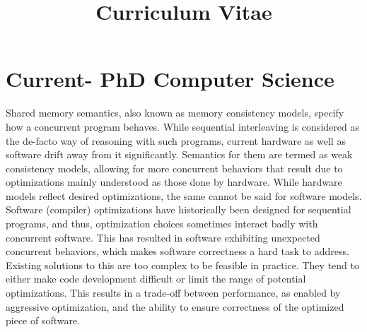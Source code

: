 \documentclass[11pt,a4paper,sans]{moderncv} %
\title{Curriculum Vitae}
\begin{document}

\makecvtitle %


\section{Current- PhD Computer Science}

    Shared memory semantics, also known as memory consistency models, specify how a concurrent program behaves. 
    While sequential interleaving is considered as the de-facto way of reasoning with such programs, current hardware as well as software drift away from it significantly.
    Semantics for them are termed as weak consistency models, allowing for more concurrent behaviors that result due to optimizations mainly understood as those done by hardware.
    While hardware models reflect desired optimizations, the same cannot be said for software models.
    Software (compiler) optimizations have historically been designed for sequential programs, and thus, optimization choices sometimes interact badly with concurrent software.
    This has resulted in software exhibiting unexpected concurrent behaviors, which makes software correctness a hard task to address. 
    Existing solutions to this are too complex to be feasible in practice. 
    They tend to either make code development difficult or limit the range of potential optimizations. 
    This results in a trade-off between performance, as enabled by aggressive optimization, and the ability to ensure correctness of the optimized piece of software. 
\end{document}
